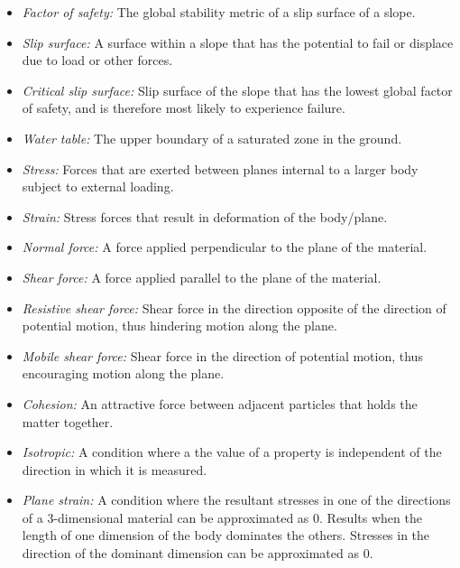\documentclass[12pt]{article}
\begin{document}
\begin{itemize}
\item {\textit{Factor of safety:} The global stability metric of a slip surface 
of a slope.}
  
\item {\textit{Slip surface:} A surface within a slope that has the potential 
to fail or displace due to load or other forces.}

\item {\textit{Critical slip surface:} Slip surface of the slope that
  has the lowest global factor of safety, and is therefore most likely to
  experience failure.}

\item {\textit{Water table:} The upper boundary of a saturated zone in the 
ground.}

\item {\textit{Stress:} Forces that are exerted between planes
  internal to a larger body subject to external loading.}
  
\item {\textit{Strain:} Stress forces that result in deformation of
  the body/plane.}
  
\item {\textit{Normal force:} A force applied perpendicular to the
  plane of the material.}
  
\item {\textit{Shear force:} A force applied parallel to the plane of
  the material.}

\item {\textit{Resistive shear force:} Shear force in the direction opposite of 
the direction of potential motion, thus hindering motion along the plane.}
	
\item {\textit{Mobile shear force:} Shear force in the direction of potential 
motion, thus encouraging motion along the plane.}
	
\item {\textit{Cohesion:} An attractive force between adjacent particles that 
holds the matter together.}
  
\item {\textit{Isotropic:} A condition where a the value of a property is 
independent of the direction in which it is measured.}
  
\item {\textit{Plane strain:} A condition where the resultant stresses in one 
of the directions of a 3-dimensional material can be approximated as
  0. Results when the length of one dimension of the body dominates
  the others. Stresses in the direction of the dominant dimension can be 
  approximated as 0.}

\end{itemize}
\end{document}
